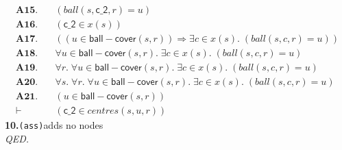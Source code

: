 \documentclass[11pt]{article}
\begin{document}
\begin{align*}
  \mathbf{A15.}\quad & (\mathit{ball}(s, \mathsf{c\_2}, r) = u) \\
  \mathbf{A16.}\quad & (\mathsf{c\_2} \in x(s)) \\
  \mathbf{A17.}\quad & ((u \in \mathsf{ball{-}cover}(s, r)) \Rightarrow \exists c \in x(s).\; (\mathit{ball}(s, c, r) = u)) \\
  \mathbf{A18.}\quad & \forall u \in \mathsf{ball{-}cover}(s, r).\; \exists c \in x(s).\; (\mathit{ball}(s, c, r) = u) \\
  \mathbf{A19.}\quad & \forall r.\; \forall u \in \mathsf{ball{-}cover}(s, r).\; \exists c \in x(s).\; (\mathit{ball}(s, c, r) = u) \\
  \mathbf{A20.}\quad & \forall s.\; \forall r.\; \forall u \in \mathsf{ball{-}cover}(s, r).\; \exists c \in x(s).\; (\mathit{ball}(s, c, r) = u) \\
  \mathbf{A21.}\quad & (u \in \mathsf{ball{-}cover}(s, r)) \\
  \vdash\quad & (\mathsf{c\_2} \in \mathit{centres}(s, u, r))
\end{align*}
\medskip\noindent\textbf{10.}\quad \texttt{(ass)}\hfill{\small adds no nodes}\\[2pt]
\emph{QED.}\par
\end{document}
